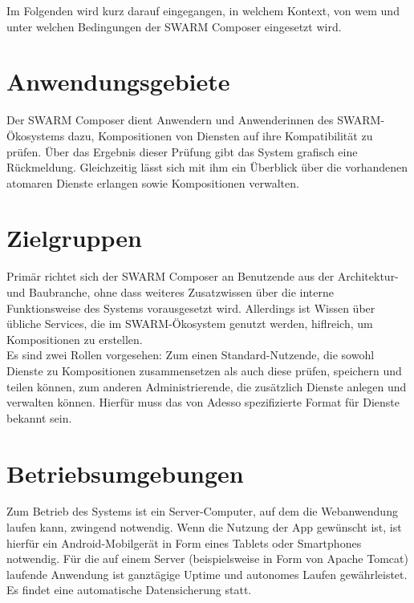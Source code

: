Im Folgenden wird kurz darauf eingegangen, in welchem Kontext, von wem und unter welchen Bedingungen der SWARM Composer eingesetzt wird.

\section*{Anwendungsgebiete}
Der SWARM Composer dient Anwendern und Anwenderinnen des SWARM-Ökosystems dazu, Kompositionen von Diensten auf ihre Kompatibilität zu prüfen. Über das Ergebnis dieser Prüfung gibt das System grafisch eine Rückmeldung. Gleichzeitig lässt sich mit ihm ein Überblick über die vorhandenen atomaren Dienste erlangen sowie Kompositionen verwalten. 

\section*{Zielgruppen}

Primär richtet sich der SWARM Composer an Benutzende aus der Architektur- und Baubranche, ohne dass weiteres Zusatzwissen über die interne Funktionsweise des Systems vorausgesetzt wird. Allerdings ist Wissen über übliche Services, die im SWARM-Ökosystem genutzt werden, hiflreich, um Kompositionen zu erstellen.\\
Es sind zwei Rollen vorgesehen: Zum einen Standard-Nutzende, die sowohl Dienste zu Kompositionen zusammensetzen als auch diese prüfen, speichern und teilen können, zum anderen Administrierende, die zusätzlich Dienste anlegen und verwalten können. Hierfür muss das von Adesso spezifizierte Format für Dienste bekannt sein.

\section*{Betriebsumgebungen}

Zum Betrieb des Systems ist ein Server-Computer, auf dem die Webanwendung laufen kann, zwingend notwendig. Wenn die Nutzung der App gewünscht ist, ist hierfür ein Android-Mobilgerät in Form eines Tablets oder Smartphones notwendig. Für die auf einem Server (beispielsweise in Form von Apache Tomcat) laufende Anwendung ist ganztägige Uptime und autonomes Laufen gewährleistet. Es findet eine automatische Datensicherung statt.




